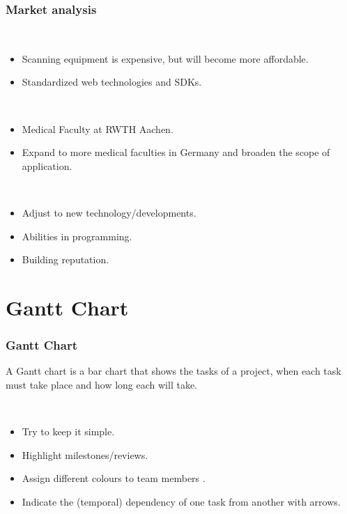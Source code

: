 \begin{frame}
  \frametitle{Market analysis}
      \begin{description}[]
        \item[Industry cost structure] \hfill \\
        \begin{itemize}
          \item Scanning equipment is expensive, but will become more affordable.
          \item Standardized web technologies and SDKs.
        \end{itemize}

        \item[Distribution Channels] \hfill \\
          \begin{itemize}
            \item Medical Faculty at RWTH Aachen.
            \item Expand to more medical faculties in Germany and  broaden the scope of application.
        \end{itemize}

\item[Key Success Factors] \hfill \\
          \begin{itemize}
            \item Adjust to new technology/developments.
           \item Abilities in programming.
	\item Building reputation.
\end{itemize}
\end{description}
\end{frame}

\section{Gantt Chart}

\begin{frame}
  \frametitle{Gantt Chart}
A Gantt chart is a bar chart that shows the tasks of a project, when each task must take place and how long each will take.  
  \begin{description}[]
	\item[Conventions] \hfill \\
	\begin{itemize}
	\item Try to keep it simple.
          \item Highlight milestones/reviews.
        \item Assign different colours to team members .
        \item Indicate the (temporal) dependency of one task from another with arrows.
\end{itemize}
 \end{description}
\end{frame}

